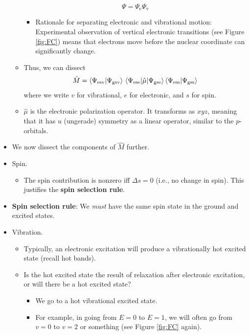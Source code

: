 \documentclass[../notes.tex]{subfiles}
\begin{document}
\begin{itemize}
\begin{itemize}
        \begin{equation*}
            \Psi = \Psi_\text{e}\Psi_\text{v}
        \end{equation*}
        \begin{itemize}
            \item Rationale for separating electronic and vibrational motion: Experimental observation of vertical electronic transitions (see Figure \ref{fig:FC}) means that electrons move before the nuclear coordinate can significantly change.
        \end{itemize}
        \item Thus, we can dissect
        \begin{equation*}
            \hat{M} = \braket{\Psi_\text{esv}}{\Psi_\text{gsv}}\mel{\Psi_\text{ese}}{\hat{\mu}}{\Psi_\text{gse}}\braket{\Psi_\text{ess}}{\Psi_\text{gss}}
        \end{equation*}
        where we write $v$ for vibrational, $e$ for electronic, and $s$ for spin.
        \item $\hat{\mu}$ is the electronic polarization operator. It transforms as $xyz$, meaning that it has $u$ (ungerade) symmetry as a linear operator, similar to the $p$-orbitals.
    \end{itemize}
    \item We now dissect the components of $\hat{M}$ further.
    \item Spin.
    \begin{itemize}
        \item The spin contribution is nonzero iff $\Delta s=0$ (i.e., no change in spin). This justifies the \textbf{spin selection rule}.
    \end{itemize}
    \item \textbf{Spin selection rule}: We \emph{must} have the same spin state in the ground and excited states.
    \item Vibration.
    \begin{itemize}
        \item Typically, an electronic excitation will produce a vibrationally hot excited state (recall hot bands).
        \item Is the hot excited state the result of relaxation after electronic excitation, or will there be a hot excited state?
        \begin{itemize}
            \item We go to a hot vibrational excited state.
            \item For example, in going from $E=0$ to $E=1$, we will often go from $v=0$ to $v=2$ or something (see Figure \ref{fig:FC} again).

\end{itemize}
\end{itemize}
\end{itemize}
\end{document}
